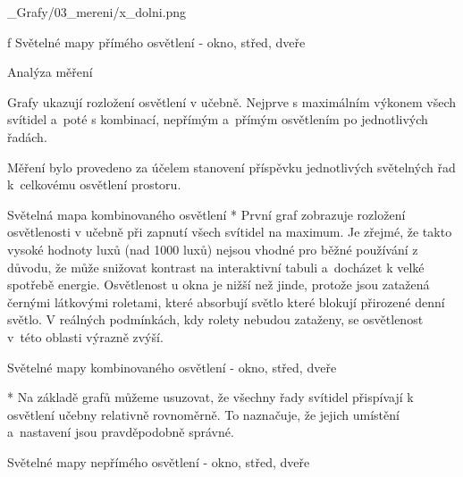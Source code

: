 \medskip {}
\picw=15cm _Grafy/03_mereni/x_dolni.png
\caption/f Světelné mapy přímého osvětlení - okno, střed, dveře
\medskip


\secc Analýza měření

Grafy ukazují rozložení osvětlení v učebně. Nejprve s maximálním výkonem všech svítidel a~poté s kombinací,
nepřímým a~přímým osvětlením po jednotlivých řadách.



Měření bylo provedeno za účelem stanovení příspěvku jednotlivých světelných řad k~celkovému osvětlení prostoru.

\medskip {} Světelná mapa kombinovaného osvětlení
\begitems
  * První graf zobrazuje rozložení osvětlenosti v učebně při zapnutí všech svítidel na maximum. Je zřejmé, že takto vysoké hodnoty luxů
    (nad 1000 luxů) nejsou vhodné pro běžné používání z důvodu, že může snižovat kontrast na interaktivní tabuli a~docházet k velké
    spotřebě energie.
    Osvětlenost u okna je nižší než jinde, protože jsou zatažená černými látkovými roletami,
    které absorbují světlo které blokují přirozené denní světlo.
    V reálných podmínkách, kdy rolety nebudou zataženy, se osvětlenost v~této oblasti výrazně zvýší.
\enditems


\medskip {} Světelné mapy kombinovaného osvětlení - okno, střed, dveře


\begitems
    * Na základě grafů můžeme usuzovat, že všechny řady svítidel přispívají k osvětlení učebny relativně rovnoměrně.
        To naznačuje, že jejich umístění a~nastavení jsou pravděpodobně správné.
\enditems

\medskip {} Světelné mapy nepřímého osvětlení - okno, střed, dveře

